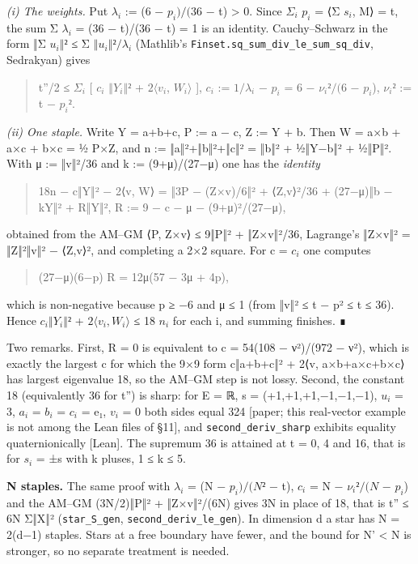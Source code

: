 \documentclass[11pt,a4paper]{article}
\theoremstyle{named}
\begin{document}
\textit{(i) The weights.} Put $λ_i$ := (6 − $p_i)/(36$ − t) \textgreater{} 0. Since $Σ_i$ $p_i$ = ⟨Σ $s_i$, M⟩ = t, the sum Σ $λ_i$ = (36 − t)/(36 − t) = 1 is an identity. Cauchy–Schwarz in the form ‖Σ $u_i‖²$ ≤ Σ $‖u_i‖²/λ_i$ (Mathlib's \texttt{Finset.\allowbreak{}sq\_\allowbreak{}sum\_\allowbreak{}div\_\allowbreak{}le\_\allowbreak{}sum\_\allowbreak{}sq\_\allowbreak{}div}, Sedrakyan) gives

\begin{quote}
t''/2 ≤ $Σ_i$ [ $c_i$ $‖Y_i‖²$ + $2⟨v_i$, $W_i⟩$ ],  $c_i$ := $1/λ_i$ − $p_i$ = 6 − $ν_i²/(6$ − $p_i$),  $ν_i²$ := t − $p_i²$.
\end{quote}
\textit{(ii) One staple.} Write Y = a+b+c, P := a − c, Z := Y + b. Then W = a×b + a×c + b×c = ½ P×Z, and n := ‖a‖²+‖b‖²+‖c‖² = ‖b‖² + ½‖Y−b‖² + ½‖P‖². With μ := ‖v‖²/36 and k := (9+μ)/(27−μ) one has the \textit{identity}

\begin{quote}
18n − c‖Y‖² − 2⟨v, W⟩ = ‖3P − (Z×v)/6‖² + ⟨Z,v⟩²/36 + (27−μ)‖b − kY‖² + R‖Y‖², R := 9 − c − μ − (9+μ)²/(27−μ),
\end{quote}
obtained from the AM–GM ⟨P, Z×v⟩ ≤ 9‖P‖² + ‖Z×v‖²/36, Lagrange's ‖Z×v‖² = ‖Z‖²‖v‖² − ⟨Z,v⟩², and completing a 2×2 square. For c = $c_i$ one computes

\begin{quote}
(27−μ)(6−p) R = 12μ(57 − 3μ + 4p),
\end{quote}
which is non-negative because p ≥ −6 and μ ≤ 1 (from ‖v‖² ≤ t − p² ≤ t ≤ 36). Hence $c_i‖Y_i‖²$ + $2⟨v_i,W_i⟩$ ≤ 18 $n_i$ for each i, and summing finishes. ∎

Two remarks. First, R = 0 is equivalent to c = 54(108 − ν²)/(972 − ν²), which is exactly the largest c for which the 9×9 form c‖a+b+c‖² + 2⟨v, a×b+a×c+b×c⟩ has largest eigenvalue 18, so the AM–GM step is not lossy. Second, the constant 18 (equivalently 36 for t'') is sharp: for E = ℝ, s = (+1,+1,+1,−1,−1,−1), $u_i$ = 3, $a_i$ = $b_i$ = $c_i$ = e₁, $v_i$ = 0 both sides equal 324 [paper; this real-vector example is not among the Lean files of §11], and \texttt{second\_\allowbreak{}deriv\_\allowbreak{}sharp} exhibits equality quaternionically [Lean]. The supremum 36 is attained at t = 0, 4 and 16, that is for $s_i$ = ±s with k pluses, 1 ≤ k ≤ 5.

\textbf{N staples.} The same proof with $λ_i$ = (N − $p_i)/(N²$ − t), $c_i$ = N − $ν_i²/(N$ − $p_i$) and the AM–GM (3N/2)‖P‖² + ‖Z×v‖²/(6N) gives 3N in place of 18, that is t'' ≤ 6N Σ‖X‖² (\texttt{star\_\allowbreak{}S\_\allowbreak{}gen}, \texttt{second\_\allowbreak{}deriv\_\allowbreak{}le\_\allowbreak{}gen}). In dimension d a star has N = 2(d−1) staples. Stars at a free boundary have fewer, and the bound for N' \textless{} N is stronger, so no separate treatment is needed.
\end{document}
